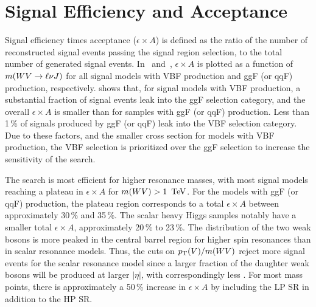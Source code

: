 %
\clearpage
\section{Signal Efficiency and Acceptance}
\label{ch:evt_sel:sig_eff}
Signal efficiency times acceptance ($\epsilon\times A$) is defined as the ratio of the number of reconstructed signal events passing the signal region selection, to the total number of generated signal events. In~\Fig{\ref{fig:sig_acc_vbf}} and~\Fig{\ref{fig:sig_acc_ggf}}, $\epsilon\times A$ is plotted as a function of $m(WV\rightarrow\ell\nu J)$ for all signal models with VBF production and ggF (or qqF) production, respectively. \Fig{\ref{fig:sig_acc_vbf}} shows that, for signal models with VBF production, a substantial fraction of signal events leak into the ggF selection category, and the overall $\epsilon\times A$ is smaller than for samples with ggF (or qqF) production. Less than 1\,\% of signals produced by ggF (or qqF) leak into the VBF selection category. Due to these factors, and the smaller cross section for models with VBF production, the VBF selection is prioritized over the ggF selection to increase the sensitivity of the search.

The search is most efficient for higher resonance masses, with most signal models reaching a plateau in $\epsilon\times A$ for $m(WV)>1\,\TeV$. For the models with ggF (or qqF) production, the plateau region corresponds to a total $\epsilon\times A$ between approximately 30\,\% and 35\,\%. The scalar heavy Higgs samples notably have a smaller total $\epsilon\times A$, approximately 20\,\% to 23\,\%. The distribution of the two weak bosons is more peaked in the central barrel region for higher spin resonances than in scalar resonance models. Thus, the cuts on $p_{\text{T}}(V)/m(WV)$ reject more signal events for the scalar resonance model since a larger fraction of the daughter weak bosons will be produced at larger $|\eta|$, with correspondingly less \pT. For most mass points, there is approximately a 50\,\% increase in $\epsilon\times A$ by including the LP SR in addition to the HP SR.

